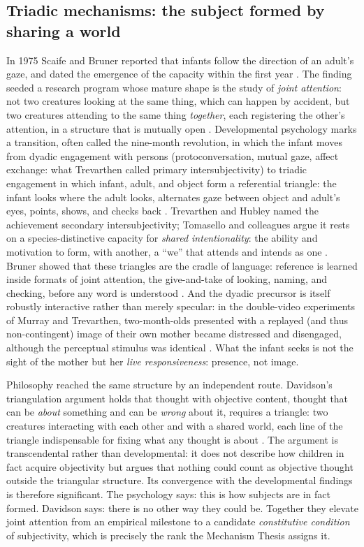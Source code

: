 \subsection{Triadic mechanisms: the subject formed by sharing a world}
\label{p05:sec:triadic}

In 1975 Scaife and Bruner reported that infants follow the direction of an adult's gaze, and dated the emergence of the capacity within the first year \parencite{scaife1975}. The finding seeded a research program whose mature shape is the study of \emph{joint attention}: not two creatures looking at the same thing, which can happen by accident, but two creatures attending to the same thing \emph{together}, each registering the other's attention, in a structure that is mutually open \parencite{tomasello1995}. Developmental psychology marks a transition, often called the nine-month revolution, in which the infant moves from dyadic engagement with persons (protoconversation, mutual gaze, affect exchange: what Trevarthen called primary intersubjectivity) to triadic engagement in which infant, adult, and object form a referential triangle: the infant looks where the adult looks, alternates gaze between object and adult's eyes, points, shows, and checks back \parencite{trevarthen1979, trevarthen1978}. Trevarthen and Hubley named the achievement secondary intersubjectivity; Tomasello and colleagues argue it rests on a species-distinctive capacity for \emph{shared intentionality}: the ability and motivation to form, with another, a ``we'' that attends and intends as one \parencite{tomasello2005, tomasello2014}. Bruner showed that these triangles are the cradle of language: reference is learned inside formats of joint attention, the give-and-take of looking, naming, and checking, before any word is understood \parencite{bruner1983}. And the dyadic precursor is itself robustly interactive rather than merely specular: in the double-video experiments of Murray and Trevarthen, two-month-olds presented with a replayed (and thus non-contingent) image of their own mother became distressed and disengaged, although the perceptual stimulus was identical \parencite{murray1985}. What the infant seeks is not the sight of the mother but her \emph{live responsiveness}: presence, not image.

Philosophy reached the same structure by an independent route. Davidson's triangulation argument holds that thought with objective content, thought that can be \emph{about} something and can be \emph{wrong} about it, requires a triangle: two creatures interacting with each other and with a shared world, each line of the triangle indispensable for fixing what any thought is about \parencite{davidson2001}. The argument is transcendental rather than developmental: it does not describe how children in fact acquire objectivity but argues that nothing could count as objective thought outside the triangular structure. Its convergence with the developmental findings is therefore significant. The psychology says: this is how subjects are in fact formed. Davidson says: there is no other way they could be. Together they elevate joint attention from an empirical milestone to a candidate \emph{constitutive condition} of subjectivity, which is precisely the rank the Mechanism Thesis assigns it.


